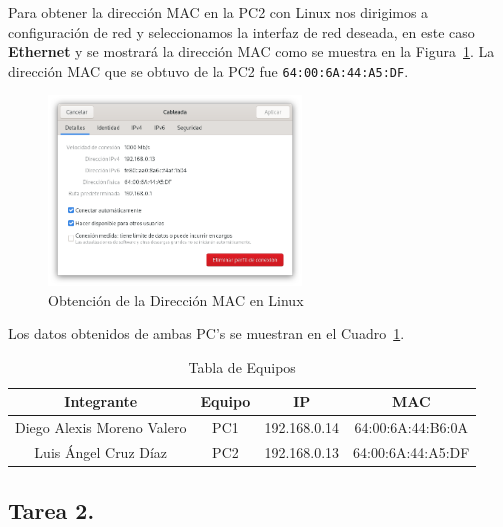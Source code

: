         Para obtener la dirección MAC en la PC2 con Linux nos dirigimos a configuración de red y seleccionamos la interfaz de red deseada, en este caso \textbf{Ethernet} y se mostrará la dirección MAC como se muestra en la Figura~\ref{fig:mac_linux}. La dirección MAC que se obtuvo de la PC2 fue \texttt{64:00:6A:44:A5:DF}.
        \begin{figure}[H]
            \centering
            \includegraphics[width=0.6\textwidth]{img/direccion_MAC_linux.png}
            \caption{Obtención de la Dirección MAC en Linux}
            \label{fig:mac_linux}
        \end{figure}

        Los datos obtenidos de ambas PC's se muestran en el Cuadro~\ref{tab:tabla_equipos}.

        \begin{table}[H]
            \centering
            \begin{tabular}{c|c|c|c}
                \textbf{Integrante} & \textbf{Equipo} & \textbf{IP} & \textbf{MAC} \\
                \hline
                Diego Alexis Moreno Valero & PC1 & 192.168.0.14 & 64:00:6A:44:B6:0A \\
                Luis Ángel Cruz Díaz & PC2 & 192.168.0.13 & 64:00:6A:44:A5:DF \\
            \end{tabular}
            \caption{Tabla de Equipos}
            \label{tab:tabla_equipos}
        \end{table}
    \subsection{Tarea 2.}
